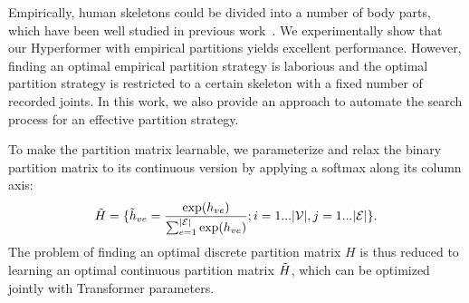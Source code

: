 \documentclass[10pt,twocolumn,letterpaper]{article}
\begin{document}
Empirically, human skeletons could be divided into a number of body parts, which have been well studied in previous work~\cite{thakkar2018part, huang2020part, song2020stronger}.
We experimentally show that our Hyperformer with empirical partitions yields excellent performance. 
However, finding an optimal empirical partition strategy is laborious and the optimal partition strategy is restricted to a certain skeleton with a fixed number of recorded joints. In this work, we also provide an approach to automate the search process for an effective partition strategy.


To make the partition matrix learnable, we parameterize and relax the binary partition matrix to its continuous version by applying a softmax along its column axis:
\begin{equation}
    \Tilde{H} = \{ \Tilde{h}_{ve} = \frac{{\rm exp} (h_{ve})} {\sum^{\vert \mathcal{E}\vert}_{e=1} {\rm exp} (h_{ve})}; i=1...\vert \mathcal{V} \vert, j=1...\vert \mathcal{E} \vert \}.
\end{equation}
The problem of finding an optimal discrete partition matrix $H$ is thus reduced to learning an optimal continuous partition matrix $\Tilde{H}$, which can be optimized jointly with Transformer parameters. 



\end{document}
